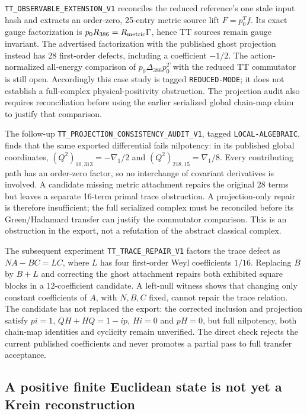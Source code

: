 \documentclass[11pt]{article}
\theoremstyle{definition}
\theoremstyle{remark}
\newcommand{\cert}[1]{\nolinkurl{#1}}
\newcommand{\rtype}[1]{\nolinkurl{#1}}
\begin{document}
\cert{TT_OBSERVABLE_EXTENSION_V1} reconciles the reduced reference's one
stale input hash and extracts an order-zero, 25-entry metric source lift
$F=p_0^T f$. Its exact gauge factorization is
$p_0R_{386}=R_{\rm metric}\Gamma$, hence TT sources remain gauge invariant.
The advertised factorization with the published ghost projection instead
has 28 first-order defects, including a coefficient $-1/2$.
The action-normalized all-energy comparison of
$p_0\Delta_{386}p_0^T$ with the reduced TT commutator is still open.
Accordingly this case study is tagged \rtype{REDUCED-MODE}; it does not
establish a full-complex physical-positivity obstruction. The projection audit
also requires reconciliation before using the earlier serialized global
chain-map claim to justify that comparison.

The follow-up \cert{TT_PROJECTION_CONSISTENCY_AUDIT_V1}, tagged
\rtype{LOCAL-ALGEBRAIC}, finds that the same exported differential fails
nilpotency: in its published global coordinates,
$(Q^2)_{10,313}=-\nabla_1/2$ and $(Q^2)_{218,15}=\nabla_1/8$.
Every contributing path has an order-zero factor, so no interchange of
covariant derivatives is involved. A candidate missing metric attachment
repairs the original 28 terms but leaves a separate 16-term primal trace
obstruction. A projection-only repair is therefore insufficient; the full
serialized complex must be reconciled before its Green/Hadamard transfer
can justify the commutator comparison. This is an obstruction in the export,
not a refutation of the abstract classical complex.

The subsequent experiment \cert{TT_TRACE_REPAIR_V1} factors the trace defect
as $NA-BC=LC$, where $L$ has four first-order Weyl coefficients $1/16$.
Replacing $B$ by $B+L$ and correcting the ghost attachment repairs both
exhibited square blocks in a 12-coefficient candidate. A left-null witness
shows that changing only constant coefficients of $A$, with $N,B,C$ fixed,
cannot repair the trace relation. The candidate has not replaced the export:
the corrected inclusion and projection satisfy $pi=1$,
$QH+HQ=1-ip$, $Hi=0$ and $pH=0$, but full nilpotency, both chain-map
identities and cyclicity remain unverified. The direct
check  rejects the
current published coefficients and never promotes a partial pass to full
transfer acceptance.

\subsection{A positive finite Euclidean state is not yet a Krein reconstruction}
\end{document}

